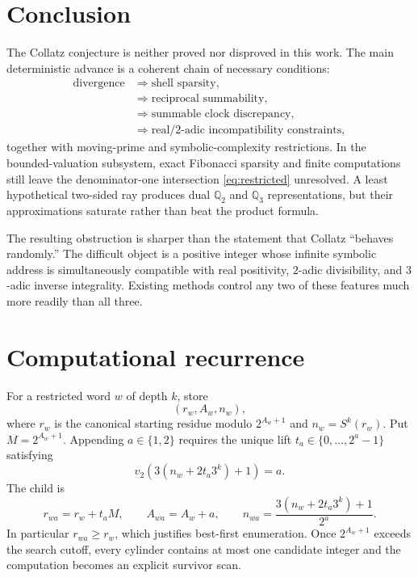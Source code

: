 \documentclass[11pt,reqno]{amsart}
\theoremstyle{plain}
\theoremstyle{definition}
\numberwithin{equation}{section}
\newcommand{\Qp}[1]{\mathbb{Q}_{#1}}
\begin{document}
\section{Conclusion}
\label{sec:conclusion}

The Collatz conjecture is neither proved nor disproved in this work.  The main
deterministic advance is a coherent chain of necessary conditions:
\[
\begin{aligned}
\text{divergence}
&\Longrightarrow \text{shell sparsity},\\
&\Longrightarrow \text{reciprocal summability},\\
&\Longrightarrow \text{summable clock discrepancy},\\
&\Longrightarrow \text{real/$2$-adic incompatibility constraints},
\end{aligned}
\]
together with moving-prime and symbolic-complexity restrictions.  In the
bounded-valuation subsystem, exact Fibonacci sparsity and finite computations
still leave the denominator-one intersection \eqref{eq:restricted} unresolved.
A least hypothetical two-sided ray produces dual $\Qp{2}$ and $\Qp{3}$
representations, but their approximations saturate rather than beat the
product formula.

The resulting obstruction is sharper than the statement that Collatz
\enquote{behaves randomly.}  The difficult object is a positive integer whose
infinite symbolic address is simultaneously compatible with real positivity,
$2$-adic divisibility, and $3$-adic inverse integrality.  Existing methods
control any two of these features much more readily than all three.

\appendix

\section{Computational recurrence}
\label{app:recurrence}

For a restricted word $w$ of depth $k$, store
\[
(r_w,A_w,n_w),
\]
where $r_w$ is the canonical starting residue modulo $2^{A_w+1}$ and
$n_w=S^k(r_w)$.  Put $M=2^{A_w+1}$.  Appending $a\in\{1,2\}$ requires the
unique lift $t_a\in\{0,\ldots,2^a-1\}$ satisfying
\[
v_2\!\left(3(n_w+2t_a3^k)+1\right)=a.
\]
The child is
\[
r_{wa}=r_w+t_aM,
\qquad
A_{wa}=A_w+a,
\qquad
n_{wa}=\frac{3(n_w+2t_a3^k)+1}{2^a}.
\]
In particular $r_{wa}\ge r_w$, which justifies best-first enumeration.
Once $2^{A_w+1}$ exceeds the search cutoff, every cylinder contains at most one
candidate integer and the computation becomes an explicit survivor scan.
\end{document}

